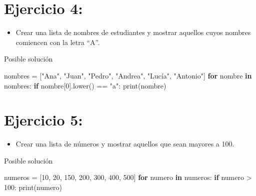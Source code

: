 \documentclass[
  a4paper,
  DIV=11,
  numbers=noendperiod,
  onepage,
  openany]{scrreprt}
\newenvironment{Shaded}{\begin{snugshade}}{\end{snugshade}}
\newcommand{\BuiltInTok}[1]{\textcolor[rgb]{0.00,0.23,0.31}{#1}}
\newcommand{\ControlFlowTok}[1]{\textcolor[rgb]{0.00,0.23,0.31}{\textbf{#1}}}
\newcommand{\DecValTok}[1]{\textcolor[rgb]{0.68,0.00,0.00}{#1}}
\newcommand{\KeywordTok}[1]{\textcolor[rgb]{0.00,0.23,0.31}{\textbf{#1}}}
\newcommand{\NormalTok}[1]{\textcolor[rgb]{0.00,0.23,0.31}{#1}}
\newcommand{\OperatorTok}[1]{\textcolor[rgb]{0.37,0.37,0.37}{#1}}
\newcommand{\StringTok}[1]{\textcolor[rgb]{0.13,0.47,0.30}{#1}}
\providecommand{\tightlist}{%
  \setlength{\itemsep}{0pt}\setlength{\parskip}{0pt}}\usepackage{longtable,booktabs,array}
\begin{document}
\begin{tcolorbox}
\section{Ejercicio 4:}\label{ejercicio-4-3}

\begin{itemize}
\tightlist
\item
  Crear una lista de nombres de estudiantes y mostrar aquellos cuyos
  nombres comiencen con la letra ``A''.
\end{itemize}

Posible solución

\begin{Shaded}
\begin{Highlighting}[]
\NormalTok{nombres }\OperatorTok{=}\NormalTok{ [}\StringTok{"Ana"}\NormalTok{, }\StringTok{"Juan"}\NormalTok{, }\StringTok{"Pedro"}\NormalTok{, }\StringTok{"Andrea"}\NormalTok{, }\StringTok{"Lucía"}\NormalTok{, }\StringTok{"Antonio"}\NormalTok{]}
\ControlFlowTok{for}\NormalTok{ nombre }\KeywordTok{in}\NormalTok{ nombres:}
    \ControlFlowTok{if}\NormalTok{ nombre[}\DecValTok{0}\NormalTok{].lower() }\OperatorTok{==} \StringTok{"a"}\NormalTok{:}
        \BuiltInTok{print}\NormalTok{(nombre)}
\end{Highlighting}
\end{Shaded}

\section{Ejercicio 5:}\label{ejercicio-5-3}

\begin{itemize}
\tightlist
\item
  Crear una lista de números y mostrar aquellos que sean mayores a 100.
\end{itemize}

Posible solución

\begin{Shaded}
\begin{Highlighting}[]
\NormalTok{numeros }\OperatorTok{=}\NormalTok{ [}\DecValTok{10}\NormalTok{, }\DecValTok{20}\NormalTok{, }\DecValTok{150}\NormalTok{, }\DecValTok{200}\NormalTok{, }\DecValTok{300}\NormalTok{, }\DecValTok{400}\NormalTok{, }\DecValTok{500}\NormalTok{]}
\ControlFlowTok{for}\NormalTok{ numero }\KeywordTok{in}\NormalTok{ numeros:}
    \ControlFlowTok{if}\NormalTok{ numero }\OperatorTok{\textgreater{}} \DecValTok{100}\NormalTok{:}
        \BuiltInTok{print}\NormalTok{(numero)}
\end{Highlighting}
\end{Shaded}


\end{tcolorbox}
\end{document}
